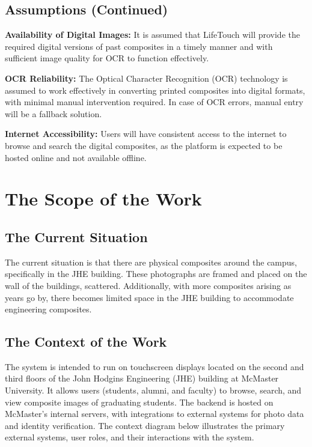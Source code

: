 \documentclass[12pt]{article}
\begin{document}
\subsection{Assumptions (Continued)}

\textbf{Availability of Digital Images:} It is assumed that LifeTouch will provide the required digital versions of past composites in a timely manner and with sufficient image quality for OCR to function effectively.

\textbf{OCR Reliability:} The Optical Character Recognition (OCR) technology is assumed to work effectively in converting printed composites into digital formats, with minimal manual intervention required. In case of OCR errors, manual entry will be a fallback solution.

\textbf{Internet Accessibility:} Users will have consistent access to the internet to browse and search the digital composites, as the platform is expected to be hosted online and not available offline.

\section{The Scope of the Work}

\subsection{The Current Situation}
The current situation is that there are physical composites around the campus, specifically in the JHE building. These photographs are framed and placed on the wall of the buildings, scattered. Additionally, with more composites arising as years go by, there becomes limited space in the JHE building to accommodate engineering composites.

\subsection{The Context of the Work}
The system is intended to run on touchscreen displays located on the second and third floors of the John Hodgins Engineering (JHE) building at McMaster University. It allows users (students, alumni, and faculty) to browse, search, and view composite images of graduating students. The backend is hosted on McMaster's internal servers, with integrations to external systems for photo data and identity verification.
\newline
The context diagram below illustrates the primary external systems, user roles, and their interactions with the system.
\end{document}
